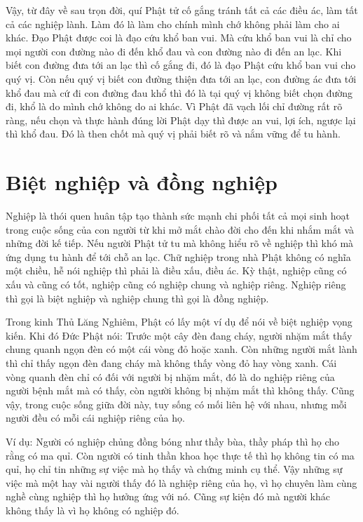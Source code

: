 \documentclass[
  12pt,
  oneside]{book}
\begin{document}
Vậy, từ đây về sau trọn đời, quí Phật tử cố gắng tránh tất cả các điều ác, làm tất cả các nghiệp lành. Làm đó là làm cho chính mình chớ không phải làm cho ai khác. Đạo Phật được coi là đạo cứu khổ ban vui. Mà cứu khổ ban vui là chỉ cho mọi người con đường nào đi đến khổ đau và con đường nào đi đến an lạc. Khi biết con đường đưa tới an lạc thì cố gắng đi, đó là đạo Phật cứu khổ ban vui cho quý vị. Còn nếu quý vị biết con đường thiện đưa tới an lạc, con đường ác đưa tới khổ đau mà cứ đi con đường đau khổ thì đó là tại quý vị không biết chọn đường đi, khổ là do mình chớ không do ai khác. Vì Phật đã vạch lối chỉ đường rất rõ ràng, nếu chọn và thực hành đúng lời Phật dạy thì được an vui, lợi ích, ngược lại thì khổ đau. Đó là then chốt mà quý vị phải biết rõ và nắm vững để tu hành.

\hypertarget{biet-nghiep-va-dong-nghiep}{%
\chapter*{Biệt nghiệp và đồng nghiệp}\label{biet-nghiep-va-dong-nghiep}}

Nghiệp là thói quen huân tập tạo thành sức mạnh chi phối tất cả mọi sinh hoạt trong cuộc sống của con người từ khi mở mắt chào đời cho đến khi nhắm mắt và những đời kế tiếp. Nếu người Phật tử tu mà không hiểu rõ về nghiệp thì khó mà ứng dụng tu hành để tới chỗ an lạc. Chữ nghiệp trong nhà Phật không có nghĩa một chiều, hễ nói nghiệp thì phải là điều xấu, điều ác. Kỳ thật, nghiệp cũng có xấu và cũng có tốt, nghiệp cũng có nghiệp chung và nghiệp riêng. Nghiệp riêng thì gọi là biệt nghiệp và nghiệp chung thì gọi là đồng nghiệp.

Trong kinh Thủ Lăng Nghiêm, Phật có lấy một ví dụ để nói về biệt nghiệp vọng kiến. Khi đó Đức Phật nói: Trước một cây đèn đang cháy, người nhặm mắt thấy chung quanh ngọn đèn có một cái vòng đỏ hoặc xanh. Còn những người mắt lành thì chỉ thấy ngọn đèn đang cháy mà không thấy vòng đỏ hay vòng xanh. Cái vòng quanh đèn chỉ có đối với người bị nhặm mắt, đó là do nghiệp riêng của người bệnh mắt mà có thấy, còn người không bị nhặm mắt thì không thấy. Cũng vậy, trong cuộc sống giữa đời này, tuy sống có mối liên hệ với nhau, nhưng mỗi người đều có mỗi cái nghiệp riêng của họ.

Ví dụ: Người có nghiệp chủng đồng bóng như thầy bùa, thầy pháp thì họ cho rằng có ma quỉ. Còn người có tinh thần khoa học thực tế thì họ không tin có ma quỉ, họ chỉ tin những sự việc mà họ thấy và chứng minh cụ thể. Vậy những sự việc mà một hay vài người thấy đó là nghiệp riêng của họ, vì họ chuyên làm cùng nghề cùng nghiệp thì họ hưởng ứng với nó. Cũng sự kiện đó mà người khác không thấy là vì họ không có nghiệp đó.
\end{document}
